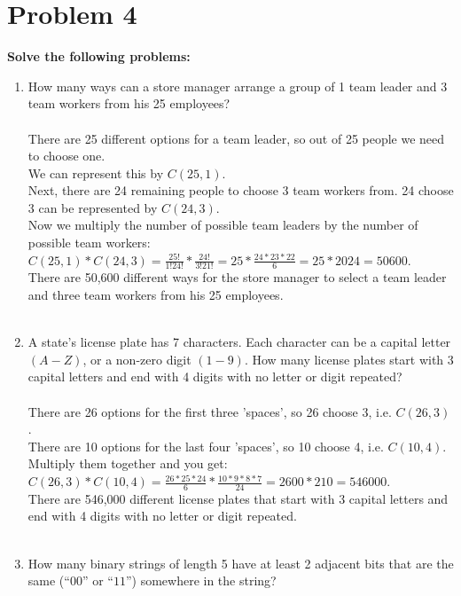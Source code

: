 \documentclass{amsart}
\theoremstyle{definition}
\theoremstyle{Exercise}
\theoremstyle{remark}
\theoremstyle{rule}
\numberwithin{equation}{section}
\begin{document}
  \section*{Problem 4}
  {\bf Solve the following problems:}
  \begin{enumerate}[label=(\alph*)]
    \item How many ways can a store manager arrange a group of 1 team leader and 3 team workers from his 25 employees?
\\\\
  There are 25 different options for a team leader, so out of 25 people we need to choose one.\\
  We can represent this by $C(25,1)$.\\
  Next, there are 24 remaining people to choose 3 team workers from. 24 choose 3 can be represented by $C(24,3)$.\\
  Now we multiply the number of possible team leaders by the number of possible team workers:\\
  $C(25,1) * C(24,3) = \frac{25!}{1!24!} * \frac{24!}{3!21!} = 25 * \frac{24 * 23 * 22}{6} = 25 * 2024 = 50600$.\\
  There are 50,600 different ways for the store manager to select a team leader and three team workers from his 25 employees.
\\\\
    \item A state’s license plate has 7 characters. Each character can be a capital letter $(A-Z)$, or a non-zero digit $(1-9)$. How many license plates start with 3 capital letters and end with 4 digits with no letter or digit repeated?
\\\\
  There are 26 options for the first three 'spaces', so 26 choose 3, i.e. $C(26,3)$.\\
  There are 10 options for the last four 'spaces', so 10 choose 4, i.e. $C(10,4)$.\\
  Multiply them together and you get:\\
  $C(26,3) * C(10,4) = \frac{26*25*24}{6} * \frac{10*9*8*7}{24} = 2600*210 = 546000$.\\
  There are 546,000 different license plates that start with 3 capital letters and end with 4 digits with no letter or digit repeated.
\\\\
    \item How many binary strings of length 5 have at least 2 adjacent bits that are the same (``$00$'' or ``$11$'') somewhere in the string?

\end{enumerate}
\end{document}
